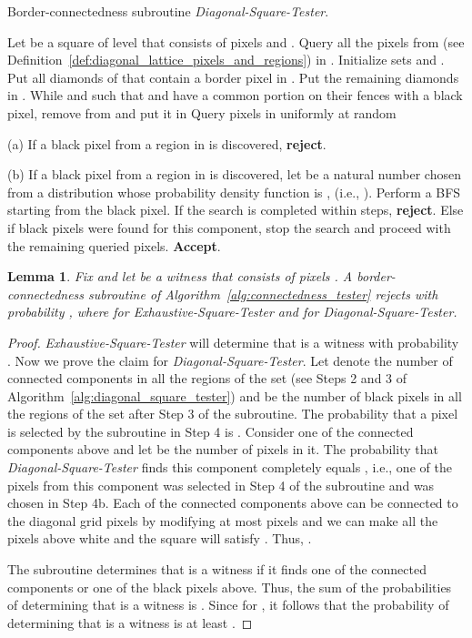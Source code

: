 \documentclass[11pt,english]{article}
\newtheorem{lemma}[theorem]{Lemma}
\numberwithin{figure}{section}
\newcommand{\Accept}{\textbf{Accept}\xspace}
\newcommand{\reject}{\textbf{reject}\xspace}
\begin{document}
\begin{algorithm}
\label{alg:diagonal_square_tester}
\caption{Border-connectedness subroutine \emph{Diagonal-Square-Tester}.}
\DontPrintSemicolon
\BlankLine
Let  be a square of level  that consists of pixels  and
.\;
\nl Query all the pixels from  (see
Definition~\ref{def:diagonal_lattice_pixels_and_regions}) in .\;
\nl
Initialize sets  and . Put all diamonds of  that contain
a border pixel in . Put the remaining diamonds in .
\;
\nl
While  and  such that  and
 have a common portion on their fences with a black pixel, remove 
from  and put it in \;
  \nl
Query  pixels in  uniformly at random

  (a) If a black pixel from a region in  is discovered, \reject.

  (b) If a black pixel from a region in  is discovered, let  be a natural
  number chosen from a distribution whose probability
  density function is ,  (i.e.,
  ).
  Perform a BFS starting from the black pixel.
  If the search is completed within  steps, \reject. Else if  black pixels
  were found for this component, stop the search and proceed with the remaining
  queried pixels.
\;
\nl
\Accept.
\end{algorithm}
\begin{lemma}
\label{lm:success_probability}
Fix  and let  be a witness that consists of pixels
.
A border-connectedness subroutine of
Algorithm~\ref{alg:connectedness_tester} rejects  with
probability , where  for \emph{Exhaustive-Square-Tester} and  for \emph{Diagonal-Square-Tester}.
\end{lemma}
\begin{proof}
\emph{Exhaustive-Square-Tester} will determine that  is a witness with
probability . Now we prove the claim
for \emph{Diagonal-Square-Tester}. Let  denote the number of connected components
in all the regions of the set  (see Steps 2 and 3 of
Algorithm~\ref{alg:diagonal_square_tester}) and  be the number
of black pixels in all the regions of the set  after Step 3 of the subroutine.
The probability that a pixel is selected by the subroutine in Step 4 is
.
Consider one of the  connected components above and let  be the number of
pixels in it.
The probability that \emph{Diagonal-Square-Tester} finds this component completely equals
, i.e., one of the  pixels
from this component was selected in Step 4 of the subroutine and  was
chosen in Step 4b. Each of the  connected components above can be
connected to the diagonal grid pixels by modifying at most  pixels
and we can make all the  pixels above white and the square will satisfy
. Thus, .

The subroutine determines that  is a witness if it finds one of the  connected components or one of the  black pixels above.
Thus, the sum of the probabilities of determining that  is a witness  is
 .
 Since  for , it follows that the
 probability of determining that  is a witness is at least .
\end{proof}
\end{document}
